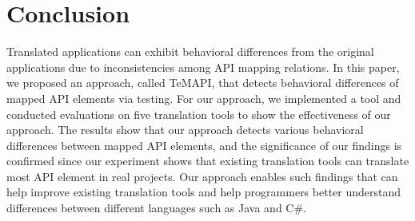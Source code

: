 \section{Conclusion}
\label{sec:conclusion}

Translated applications can exhibit behavioral differences from the original applications due to inconsistencies among API mapping relations. In this paper, we proposed an approach, called TeMAPI, that detects behavioral differences of mapped API elements via testing. For our approach, we implemented a tool and conducted evaluations on five translation tools to show the effectiveness of our approach. The results show that our approach detects various behavioral differences between mapped API elements, and the significance of our findings is confirmed since our experiment shows that existing translation tools can translate most API element in real projects. Our approach enables such findings that can help improve existing translation tools and help programmers better understand differences between different languages such as Java and C\#.

